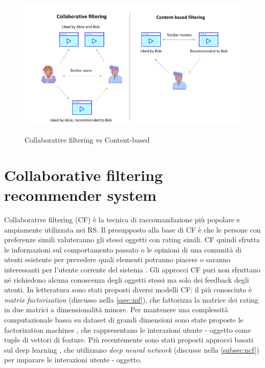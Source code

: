 \begin{figure}
  \centering
  \includegraphics[width=\linewidth]{immagini/cb_cf_schema.png}
  \caption{Collaborative filtering vs Content-based}
  \cite{cf-cb-picture}
  \label{fig:cb-cf}
  
\end{figure}

\section{Collaborative filtering recommender system}
Collaborative filtering (CF) è la tecnica di raccomandazione più popolare e ampiamente utilizzata nei RS. %
Il presupposto alla base di CF è che le persone con preferenze simili valuteranno gli stessi oggetti con rating simili. CF quindi sfrutta le informazioni sul comportamento passato o le opinioni di una comunità di utenti esistente per prevedere quali elementi potranno piacere o saranno interessanti per l'utente corrente del sistema \cite{recsys-intro}. Gli approcci CF puri non sfruttano né richiedono alcuna conoscenza degli oggetti stessi ma solo dei feedback degli utenti. In letteratura sono stati proposti diversi modelli CF: il più conosciuto è \textit{matrix  factorization} \cite{matrix-factorization} (discusso nella \autoref{ssec:mf}), che fattorizza la matrice dei rating in due matrici a dimensionalità minore. Per mantenere una complessità computazionale bassa su dataset di grandi dimensioni sono state proposte le factorization machines \cite{factorization-machines}, che rappresentano le interazioni utente - oggetto come tuple di vettori di feature. Più recentemente sono stati proposti approcci basati sul deep learning \cite{deep-learning-survey} \cite{NCF}, che utilizzano \textit{deep neural network} (discusse nella \autoref{subsec:ncf}) per imparare le interazioni utente - oggetto.

